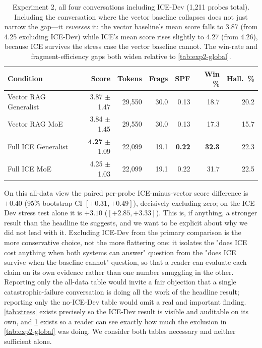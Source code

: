 \documentclass[10pt]{article}
\begin{document}
\begin{table}[htbp]
\centering
\small
\caption{Experiment 2, all four conversations including ICE-Dev (1{,}211 probes total). Including the conversation where the vector baseline collapses does not just narrow the gap---it \emph{reverses} it: the vector baseline's mean score falls to 3.87 (from 4.25 excluding ICE-Dev) while ICE's mean score rises slightly to 4.27 (from 4.26), because ICE survives the stress case the vector baseline cannot. The win-rate and fragment-efficiency gaps both widen relative to \cref{tab:exp2-global}.}
\label{tab:exp2-alldata}
\begin{tabular}{@{}lrrrrrr@{}}
\toprule
\textbf{Condition} & \textbf{Score} & \textbf{Tokens} & \textbf{Frags} & \textbf{SPF} & \textbf{Win \%} & \textbf{Hall.\ \%} \\
\midrule
Vector RAG Generalist & 3.87 $\pm$ 1.47 & 29{,}550 & 30.0 & 0.13 & 18.7 & 20.2 \\
Vector RAG MoE        & 3.84 $\pm$ 1.45 & 29{,}550 & 30.0 & 0.13 & 17.3 & 15.7 \\
Full ICE Generalist   & \textbf{4.27} $\pm$ 1.09 & 22{,}099 & 19.1 & \textbf{0.22} & \textbf{32.3} & 22.3 \\
Full ICE MoE          & 4.25 $\pm$ 1.03 & 22{,}099 & 19.1 & 0.22 & 31.7 & 22.5 \\
\bottomrule
\end{tabular}
\end{table}

On this all-data view the paired per-probe ICE-minus-vector score difference is $+0.40$ (95\% bootstrap CI $[+0.31, +0.49]$), decisively excluding zero; on the ICE-Dev stress test alone it is $+3.10$ ($[+2.85, +3.33]$). This is, if anything, a stronger result than the headline tie suggests, and we want to be explicit about why we did not lead with it. Excluding ICE-Dev from the primary comparison is the more conservative choice, not the more flattering one: it isolates the "does ICE cost anything when both systems can answer" question from the "does ICE survive when the baseline cannot" question, so that a reader can evaluate each claim on its own evidence rather than one number smuggling in the other. Reporting only the all-data table would invite a fair objection that a single catastrophic-failure conversation is doing all the work of the headline result; reporting only the no-ICE-Dev table would omit a real and important finding. \cref{tab:stress} exists precisely so the ICE-Dev result is visible and auditable on its own, and \cref{tab:exp2-alldata} exists so a reader can see exactly how much the exclusion in \cref{tab:exp2-global} was doing. We consider both tables necessary and neither sufficient alone.
\end{document}

